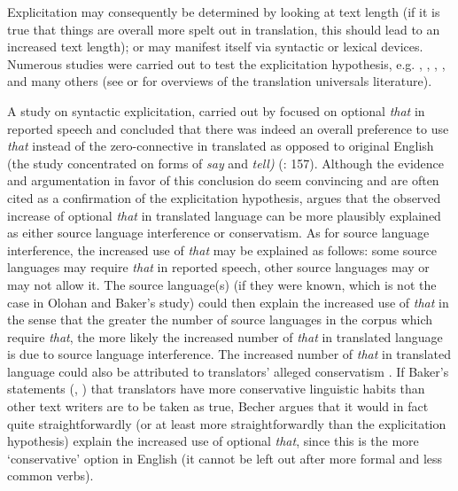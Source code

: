 Explicitation may consequently be determined by looking at text length (if it is true that things are overall more spelt out in translation, this should lead to an increased text length); or may manifest itself via syntactic or lexical devices. Numerous studies were carried out to test the explicitation hypothesis, e.g. \citet{overas_search_1998}, \citet{OlohanBaker2000}, \citet{olohan_how_2003}, \citet{mutesayire_apposition_2004}, \citet{mauranen_explicitation_2004} and many others   (see \citet{Kruger2012} or \citet{zanettin_corpus_2013} for overviews of the translation universals literature).



A study on syntactic explicitation, carried out by  \citet{OlohanBaker2000} focused on optional \textit{that} in reported speech and concluded that there was indeed an overall preference to use \textit{that} instead of the zero-connective in translated as opposed to original English (the study concentrated on forms of \textit{say} and \textit{tell)}  (\citealt{OlohanBaker2000}: 157). Although the evidence and argumentation in favor of this conclusion do seem convincing and are often cited as a confirmation of the explicitation hypothesis, \citet[10-11]{becher_abandoning_2010} argues that the observed increase of optional \textit{that} in translated language can be more plausibly explained as either source language interference or conservatism. As for source language interference, the increased use of \textit{that} may be explained as follows: some source languages may require \textit{that} in reported speech, other source languages may or may not allow it. The source language(s) (if they were known, which is not the case in Olohan and Baker’s study) could then explain the increased use of \textit{that} in the sense that the greater the number of source languages in the corpus which require \textit{that}, the more likely the increased number of \textit{that} in translated language is due to source language interference. The increased number of \textit{that} in translated language could also be attributed to translators’ alleged conservatism \citep{becher_abandoning_2010}. If Baker’s statements (\citeyear[244]{baker_corpus_1993}, \citet[183]{1996}) that translators have more conservative linguistic habits than other text writers are to be taken as true, Becher argues that it would in fact quite straightforwardly (or at least more straightforwardly than the explicitation hypothesis) explain the increased use of optional \textit{that}, since this is the more ‘conservative’ option in English (it cannot be left out after more formal and less common verbs).



